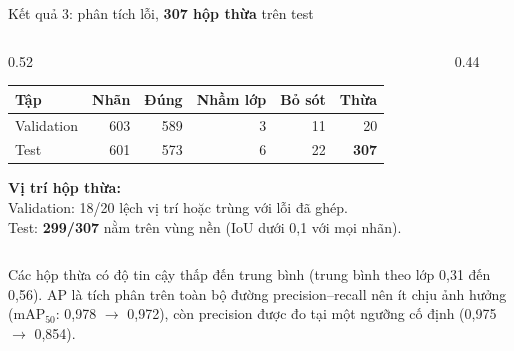 \documentclass[aspectratio=169,11pt,t]{beamer}
\newcommand{\hl}[1]{{\bfseries\color{coral}#1}}
\newcommand{\hdr}[1]{{\bfseries\color{muted}#1}}
\begin{document}
\begin{frame}{Kết quả 3: phân tích lỗi, \hl{307 hộp thừa} trên test}
  \begin{columns}[T]
    \begin{column}{0.52\textwidth}
      \footnotesize
      \renewcommand{\arraystretch}{1.35}\setlength{\tabcolsep}{2.5pt}
      \begin{tabular}{@{}lrrrrr@{}}
        \toprule
        \hdr{Tập} & \hdr{Nhãn} & \hdr{Đúng} & \hdr{Nhầm lớp} & \hdr{Bỏ sót} & \hdr{Thừa} \\
        \midrule
        Validation & 603 & 589 & 3 & 11 & 20 \\
        Test & 601 & 573 & 6 & 22 & \cellcolor{danger!15}\textbf{307} \\
        \bottomrule
      \end{tabular}
      \vspace{4pt}\par
      \footnotesize \textbf{Vị trí hộp thừa:}\\[1pt]
      Validation: 18/20 lệch vị trí hoặc trùng với lỗi đã ghép.\\
      Test: \textbf{299/307} nằm trên vùng nền (IoU dưới 0,1 với mọi nhãn).
    \end{column}
    \begin{column}{0.44\textwidth}
      \centering
    \end{column}
  \end{columns}
  \vspace{3pt}
  \begin{why}
    \footnotesize Các hộp thừa có độ tin cậy thấp đến trung bình (trung bình theo lớp 0,31 đến 0,56). AP là tích phân trên toàn bộ đường precision--recall nên ít chịu ảnh hưởng ($\mathrm{mAP}_{50}$: 0,978 $\to$ 0,972), còn precision được đo tại một ngưỡng cố định (0,975 $\to$ 0,854).
  \end{why}
\end{frame}
\end{document}

